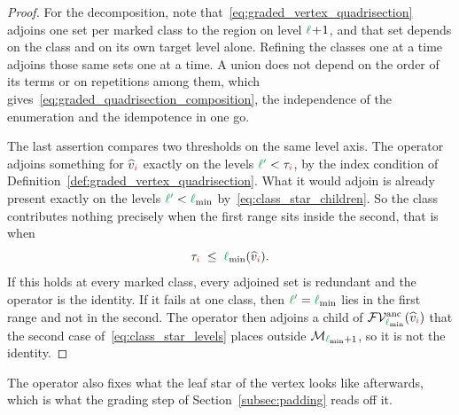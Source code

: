 \documentclass[a4paper, 12pt]{article}
\newcommand{\lmin}{\l_{\min}}
\newcommand{\targetlevel}{\tau}                                 %
\newcommand{\green}{\color{ForestGreen}}
\newcommand{\brickred}{\color{BrickRed}}
\newcommand{\V}{\mathcal{V}}
\newcommand{\F}{\mathcal{F}}
\newcommand{\vertexClass}[1]{\widehat{v}_{#1}}
\newcommand{\coarseIdxone}{{\brickred i}}
\renewcommand{\l}{{\green\ell}}
\newcommand{\lone}{{\green {\l'}  }}
\newcommand{\M}{\mathcal{M}}
\theoremstyle{definition}
\theoremstyle{plain}
\numberwithin{equation}{section}
\newcommand{\FVanc}[1]{\F\V^{\mathrm{anc}}_{#1}}            %
\begin{document}
\begin{proof}
    For the decomposition, note that~\eqref{eq:graded_vertex_quadrisection} adjoins one set per marked class to the region on level $\l \! + \! 1$, and that set depends on the class and on its own target level alone. Refining the classes one at a time adjoins those same sets one at a time. A union does not depend on the order of its terms or on repetitions among them, which gives~\eqref{eq:graded_quadrisection_composition}, the independence of the enumeration and the idempotence in one go.

    The last assertion compares two thresholds on the same level axis. The operator adjoins something for $\vertexClass{\coarseIdxone}$ exactly on the levels $\lone < \targetlevel_\coarseIdxone$, by the index condition of Definition~\ref{def:graded_vertex_quadrisection}. What it would adjoin is already present exactly on the levels $\lone < \lmin$ by~\eqref{eq:class_star_children}. So the class contributes nothing precisely when the first range sits inside the second, that is when
    \begin{equation*}
        \targetlevel_\coarseIdxone \; \leq \; \lmin(\vertexClass{\coarseIdxone}) .
    \end{equation*}
    If this holds at every marked class, every adjoined set is redundant and the operator is the identity. If it fails at one class, then $\lone = \lmin$ lies in the first range and not in the second. The operator then adjoins a child of $\FVanc{\lmin}(\vertexClass{\coarseIdxone})$ that the second case of~\eqref{eq:class_star_levels} places outside $\M_{\lmin+1}$, so it is not the identity.
\end{proof}

The operator also fixes what the leaf star of the vertex looks like afterwards, which is what the grading step of Section~\ref{subsec:padding} reads off it.
\end{document}
